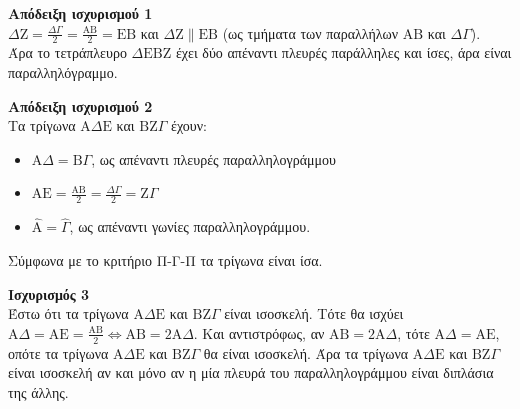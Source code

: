 \begin{alist}
    \item \textbf{Απόδειξη ισχυρισμού 1}\\
    $\Delta\mathrm{Z} = \frac{\Delta\Gamma}{2} = \frac{\mathrm{A}\mathrm{B}}{2} = \mathrm{E}\mathrm{B}$ και $\Delta\mathrm{Z} \parallel \mathrm{E}\mathrm{B}$ (ως τμήματα των παραλλήλων $\mathrm{A}\mathrm{B}$ και $\Delta\Gamma$).\\
    Άρα το τετράπλευρο $\Delta\mathrm{E}\mathrm{B}\mathrm{Z}$ έχει δύο απέναντι πλευρές παράλληλες και ίσες, άρα είναι παραλληλόγραμμο.
    
    
    \textbf{Απόδειξη ισχυρισμού 2}\\
    Τα τρίγωνα $\mathrm{A}\Delta\mathrm{E}$ και $\mathrm{B}\mathrm{Z}\Gamma$ έχουν:
    \begin{itemize}
        \item $\mathrm{A}\Delta = \mathrm{B}\Gamma$, ως απέναντι πλευρές παραλληλογράμμου
        \item $\mathrm{A}\mathrm{E} = \frac{\mathrm{A}\mathrm{B}}{2} = \frac{\Delta\Gamma}{2} = \mathrm{Z}\Gamma$
        \item $\hat{\mathrm{A}} = \hat{\Gamma}$, ως απέναντι γωνίες παραλληλογράμμου.
    \end{itemize}
    Σύμφωνα με το κριτήριο Π-Γ-Π τα τρίγωνα είναι ίσα.
    
    \item \textbf{Ισχυρισμός 3}\\
    Έστω ότι τα τρίγωνα $\mathrm{A}\Delta\mathrm{E}$ και $\mathrm{B}\mathrm{Z}\Gamma$ είναι ισοσκελή. Τότε θα ισχύει $\mathrm{A}\Delta = \mathrm{A}\mathrm{E} = \frac{\mathrm{A}\mathrm{B}}{2} \Leftrightarrow \mathrm{A}\mathrm{B} = 2\mathrm{A}\Delta$. Και αντιστρόφως, αν $\mathrm{A}\mathrm{B} = 2\mathrm{A}\Delta$, τότε $\mathrm{A}\Delta = \mathrm{A}\mathrm{E}$, οπότε τα τρίγωνα $\mathrm{A}\Delta\mathrm{E}$ και $\mathrm{B}\mathrm{Z}\Gamma$ θα είναι ισοσκελή. Άρα τα τρίγωνα $\mathrm{A}\Delta\mathrm{E}$ και $\mathrm{B}\mathrm{Z}\Gamma$ είναι ισοσκελή αν και μόνο αν η μία πλευρά του παραλληλογράμμου είναι διπλάσια της άλλης.
\end{alist}
